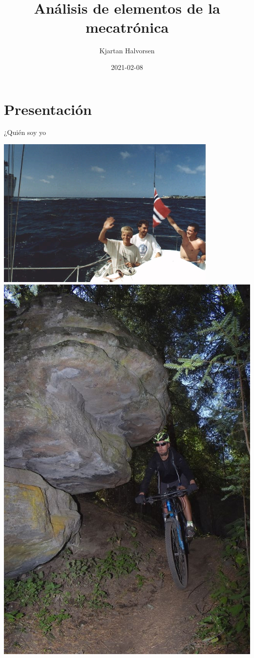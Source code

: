 \documentclass[presentation,aspectratio=169]{beamer}
\author{Kjartan Halvorsen}
\date{2021-02-08}
\title{Análisis de elementos de la mecatrónica}
\begin{document}
\maketitle

\section{Presentación}
\label{sec:org24eebae}
\begin{frame}[label={sec:org7337614}]{¿Quién soy yo}
\begin{center}
\includegraphics[height=0.6\textheight]{../../figures/red-heat-2.jpeg}
\includegraphics[height=0.6\textheight]{../../figures/mtb.jpeg}
\end{center}
\end{frame}
\end{document}
